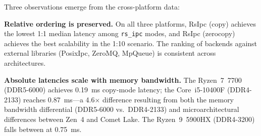 \begin{table}[htbp]
    \centering
    \caption{Cross-platform comparison (2.64~MiB pickle payload, 10 trials). Det.\@ = p99/p50.}
    \label{tab:cross_platform_results}
\end{table}

Three observations emerge from the cross-platform data:

\textbf{Relative ordering is preserved.} On all three platforms, RsIpc (copy) achieves the lowest 1:1 median latency among \texttt{rs\_ipc} modes, and RsIpc (zerocopy) achieves the best scalability in the 1:10 scenario. The ranking of backends against external libraries (PosixIpc, ZeroMQ, MpQueue) is consistent across architectures.

\textbf{Absolute latencies scale with memory bandwidth.} The Ryzen~7~7700 (DDR5-6000) achieves 0.19~ms copy-mode latency; the Core~i5-10400F (DDR4-2133) reaches 0.87~ms---a 4.6$\times$ difference resulting from both the memory bandwidth differential (DDR5-6000 vs.\ DDR4-2133) and microarchitectural differences between Zen~4 and Comet Lake. The Ryzen~9~5900HX (DDR4-3200) falls between at 0.75~ms.

